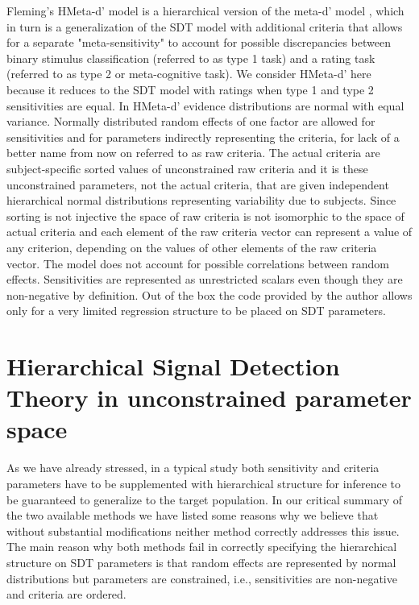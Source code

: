 \documentclass[oneside,a4paper]{article}
\begin{document}
Fleming's \citeyear{hmetad} HMeta-d' model is a hierarchical version
of the meta-d' model \cite{maniscalco2012signal}, which in turn is a
generalization of the SDT model with additional criteria that allows
for a separate "meta-sensitivity" to account for possible
discrepancies between binary stimulus classification (referred to as
type 1 task) and a rating task (referred to as type 2 or
meta-cognitive task). We consider HMeta-d' here because it reduces to
the SDT model with ratings when type 1 and type 2 sensitivities are
equal. In HMeta-d' evidence distributions are normal with equal
variance. Normally distributed random effects of one factor are
allowed for sensitivities and for parameters indirectly representing
the criteria, for lack of a better name from now on referred to as raw
criteria. The actual criteria are subject-specific sorted values of
unconstrained raw criteria and it is these unconstrained parameters,
not the actual criteria, that are given independent hierarchical
normal distributions representing variability due to subjects. Since
sorting is not injective the space of raw criteria is not isomorphic
to the space of actual criteria and each element of the raw criteria
vector can represent a value of any criterion, depending on the values
of other elements of the raw criteria vector. The model does not
account for possible correlations between random
effects. Sensitivities are represented as unrestricted scalars even
though they are non-negative by definition. Out of the box the code
provided by the author allows only for a very limited regression
structure to be placed on SDT parameters.

\section{Hierarchical Signal Detection Theory in unconstrained
  parameter space}

As we have already stressed, in a typical study both sensitivity and
criteria parameters have to be supplemented with hierarchical
structure for inference to be guaranteed to generalize to the target
population. In our critical summary of the two available methods we
have listed some reasons why we believe that without substantial
modifications neither method correctly addresses this issue. The main
reason why both methods fail in correctly specifying the hierarchical
structure on SDT parameters is that random effects are represented by
normal distributions but parameters are constrained, i.e.,
sensitivities are non-negative and criteria are ordered.
\end{document}
